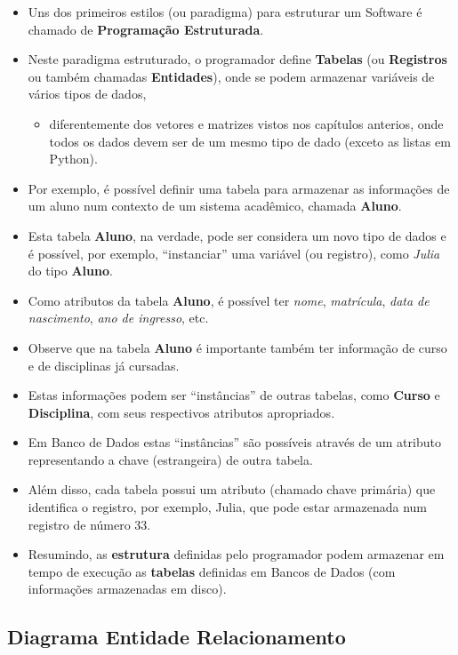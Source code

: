 \documentclass[12pt,a4paper]{article}
\providecommand{\tightlist}{%
      \setlength{\itemsep}{0pt}\setlength{\parskip}{0pt}}
\begin{document}
    \begin{itemize}
\item
  Uns dos primeiros estilos (ou paradigma) para estruturar um Software é
  chamado de \textbf{Programação Estruturada}.
\item
  Neste paradigma estruturado, o programador define \textbf{Tabelas} (ou
  \textbf{Registros} ou também chamadas \textbf{Entidades}), onde se
  podem armazenar variáveis de vários tipos de dados,

  \begin{itemize}
  \tightlist
  \item
    diferentemente dos vetores e matrizes vistos nos capítulos anterios,
    onde todos os dados devem ser de um mesmo tipo de dado (exceto as
    listas em Python).
  \end{itemize}
\item
  Por exemplo, é possível definir uma tabela para armazenar as
  informações de um aluno num contexto de um sistema acadêmico, chamada
  \textbf{Aluno}.
\item
  Esta tabela \textbf{Aluno}, na verdade, pode ser considera um novo
  tipo de dados e é possível, por exemplo, ``instanciar'' uma variável
  (ou registro), como \emph{Julia} do tipo \textbf{Aluno}.
\item
  Como atributos da tabela \textbf{Aluno}, é possível ter \emph{nome},
  \emph{matrícula}, \emph{data de nascimento}, \emph{ano de ingresso},
  etc.
\item
  Observe que na tabela \textbf{Aluno} é importante também ter
  informação de curso e de disciplinas já cursadas.
\item
  Estas informações podem ser ``instâncias'' de outras tabelas, como
  \textbf{Curso} e \textbf{Disciplina}, com seus respectivos atributos
  apropriados.
\item
  Em Banco de Dados estas ``instâncias'' são possíveis através de um
  atributo representando a chave (estrangeira) de outra tabela.
\item
  Além disso, cada tabela possui um atributo (chamado chave primária)
  que identifica o registro, por exemplo, Julia, que pode estar
  armazenada num registro de número 33.
\item
  Resumindo, as \textbf{estrutura} definidas pelo programador podem
  armazenar em tempo de execução as \textbf{tabelas} definidas em Bancos
  de Dados (com informações armazenadas em disco).
\end{itemize}

    \hypertarget{diagrama-entidade-relacionamento}{%
\subsection{Diagrama Entidade
Relacionamento}\label{diagrama-entidade-relacionamento}}
\end{document}
